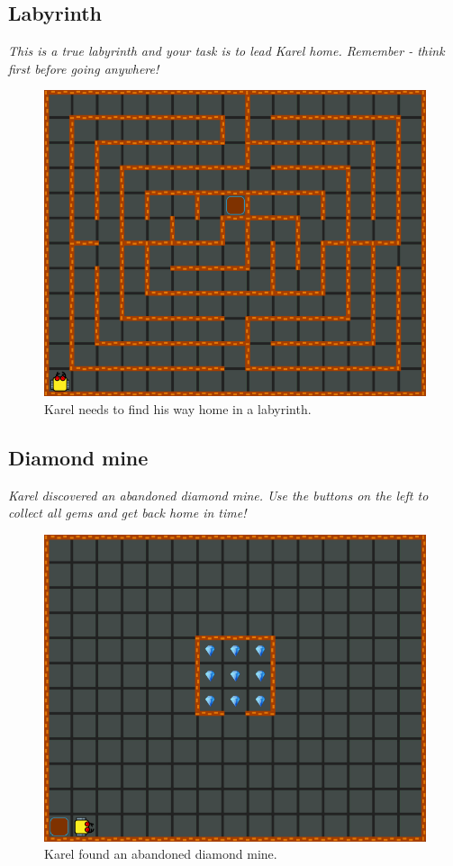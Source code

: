 \subsection{Labyrinth}

{\em This is a true labyrinth and your task is to lead Karel 
home. Remember - think first before going anywhere!}

\begin{figure}[!ht]
\begin{center}
\includegraphics[height=0.4\textwidth]{img/a10.png}
\end{center}
\vspace{-4mm}
\caption{Karel needs to find his way home in a labyrinth.}
\label{fig:a10}
\vspace{-4mm}
\end{figure}
\noindent


\subsection{Diamond mine}

{\em Karel discovered an abandoned diamond mine. Use the buttons
on the left to collect all gems and get back home in time!}

\begin{figure}[!ht]
\begin{center}
\includegraphics[height=0.4\textwidth]{img/a11.png}
\end{center}
\vspace{-4mm}
\caption{Karel found an abandoned diamond mine.}
\label{fig:a11}
\vspace{-10mm}
\end{figure}
\newpage
\noindent

